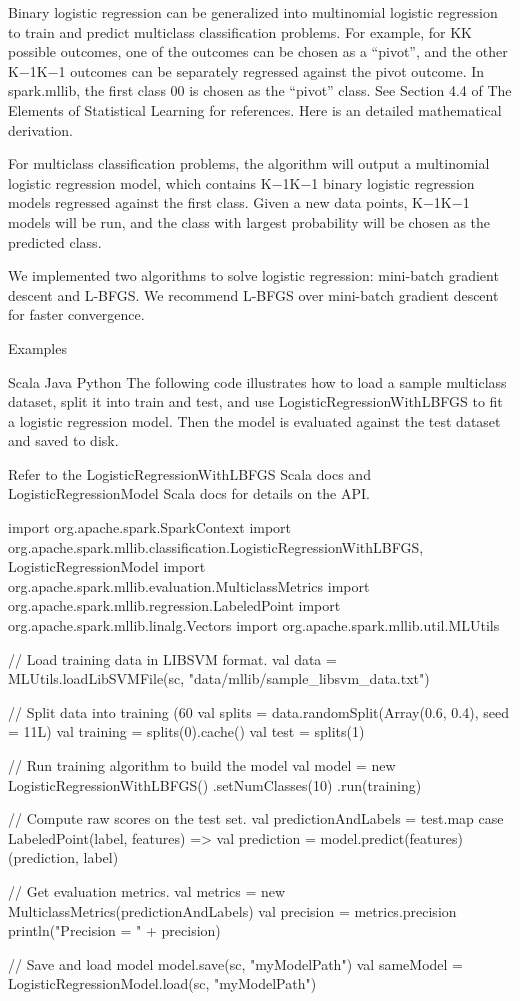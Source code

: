 Binary logistic regression can be generalized into multinomial logistic regression to train and predict multiclass classification problems. For example, for KK possible outcomes, one of the outcomes can be chosen as a “pivot”, and the other K−1K−1 outcomes can be separately regressed against the pivot outcome. In spark.mllib, the first class 00 is chosen as the “pivot” class. See Section 4.4 of The Elements of Statistical Learning for references. Here is an detailed mathematical derivation.

For multiclass classification problems, the algorithm will output a multinomial logistic regression model, which contains K−1K−1 binary logistic regression models regressed against the first class. Given a new data points, K−1K−1 models will be run, and the class with largest probability will be chosen as the predicted class.

We implemented two algorithms to solve logistic regression: mini-batch gradient descent and L-BFGS. We recommend L-BFGS over mini-batch gradient descent for faster convergence.

Examples

Scala
Java
Python
The following code illustrates how to load a sample multiclass dataset, split it into train and test, and use LogisticRegressionWithLBFGS to fit a logistic regression model. Then the model is evaluated against the test dataset and saved to disk.

Refer to the LogisticRegressionWithLBFGS Scala docs and LogisticRegressionModel Scala docs for details on the API.

import org.apache.spark.SparkContext
import org.apache.spark.mllib.classification.{LogisticRegressionWithLBFGS, LogisticRegressionModel}
import org.apache.spark.mllib.evaluation.MulticlassMetrics
import org.apache.spark.mllib.regression.LabeledPoint
import org.apache.spark.mllib.linalg.Vectors
import org.apache.spark.mllib.util.MLUtils

// Load training data in LIBSVM format.
val data = MLUtils.loadLibSVMFile(sc, "data/mllib/sample_libsvm_data.txt")

// Split data into training (60%
val splits = data.randomSplit(Array(0.6, 0.4), seed = 11L)
val training = splits(0).cache()
val test = splits(1)

// Run training algorithm to build the model
val model = new LogisticRegressionWithLBFGS()
  .setNumClasses(10)
  .run(training)

// Compute raw scores on the test set.
val predictionAndLabels = test.map { case LabeledPoint(label, features) =>
  val prediction = model.predict(features)
  (prediction, label)
}

// Get evaluation metrics.
val metrics = new MulticlassMetrics(predictionAndLabels)
val precision = metrics.precision
println("Precision = " + precision)

// Save and load model
model.save(sc, "myModelPath")
val sameModel = LogisticRegressionModel.load(sc, "myModelPath")
